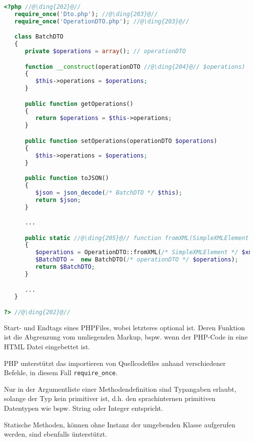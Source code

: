 \begin{lstlisting}[language=php, caption=Durch den Generator erzeugte BatchDTO Datenklasse der Spreadshirt-API als Beispiel für eine PHP-Datei]
<?php //@\ding{202}@//
   require_once('Dto.php'); //@\ding{203}@//
   require_once('OperationDTO.php'); //@\ding{203}@//

   class BatchDTO
   {
      private $operations = array(); // operationDTO 

      function __construct(operationDTO //@\ding{204}@// $operations) 
      {
         $this->operations = $operations;
      }

      public function getOperations()
      {
         return $operations = $this->operations;
      }

      public function setOperations(operationDTO $operations)
      {
         $this->operations = $operations;
      }

      public function toJSON()
      {
         $json = json_decode(/* BatchDTO */ $this);
         return $json;
      }

      ...

      public static //@\ding{205}@// function fromXML(SimpleXMLElement $xml)
      {
         $operations = OperationDTO::fromXML(/* SimpleXMLElement */ $xml->operations);
         $BatchDTO =  new BatchDTO(/* operationDTO */ $operations);
         return $BatchDTO;
      }

      ...
   }

?> //@\ding{202}@//
\end{lstlisting}

\begin{compactitem}
    \item[\ding{202}] Start- und Endtags eines PHPFiles, wobei letzteres optional ist. Deren Funktion ist die Abgrenzung vom umliegenden Markup, bspw. wenn der PHP-Code in eine HTML Datei eingebettet ist.
    \item[\ding{203}] PHP unterstützt das importieren von Quellcodefiles anhand verschiedener Befehle, in diesem Fall \texttt{require\_once}.
    \item[\ding{204}] Nur in der Argumentliste einer Methodendefinition sind Typangaben erlaubt, solange der Typ kein primitiver ist, d.h. den sprachinternen primitiven Datentypen wie bspw. String oder Integer entspricht. 
    \item[\ding{205}] Statische Methoden, können ohne Instanz der umgebenden Klasse aufgerufen werden, sind ebenfalls ünterstützt.
\end{compactitem}
